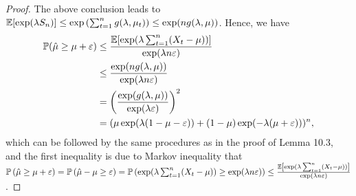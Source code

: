 \begin{proof}
    The above conclusion leads to $\mathbb{E}[\exp(\lambda S_{n})] \leq \exp\left(\sum_{t=1}^n g(\lambda, \mu_t)\right) \leq \exp(n g(\lambda, \mu))$.
    Hence, we have
    \begin{equation*}
        \begin{aligned}
            \mathbb{P}(\hat{\mu} \geq \mu+\varepsilon)
            &\leq \frac{\mathbb{E}[\exp(\lambda \sum_{t=1}^n (X_t - \mu))]}{\exp(\lambda n \varepsilon)}\\
            &\leq \frac{\exp(n g(\lambda, \mu))}{\exp(\lambda n \varepsilon)}\\
            &= \left(\frac{\exp(g(\lambda, \mu))}{\exp(\lambda \varepsilon)}\right)^2\\
            &= (\mu \exp(\lambda(1 - \mu - \varepsilon)) + (1 - \mu) \exp(-\lambda(\mu + \varepsilon)))^n,
        \end{aligned}
    \end{equation*}
    which can be followed by the same procedures as in the proof of Lemma 10.3, and the first inequality is due to Markov inequality that $\mathbb{P} \left(\hat{\mu} \geq \mu+\varepsilon\right)= \mathbb{P} \left(\hat{\mu} - \mu \geq \varepsilon\right) = \mathbb{P} \left(\exp(\lambda \sum_{t=1}^n (X_t - \mu)) \geq \exp(\lambda n \varepsilon)\right) \le \frac{\mathbb{E} \left[\exp(\lambda \sum_{t=1}^n (X_t - \mu))\right]}{\exp(\lambda n \varepsilon)}$. 
\end{proof}